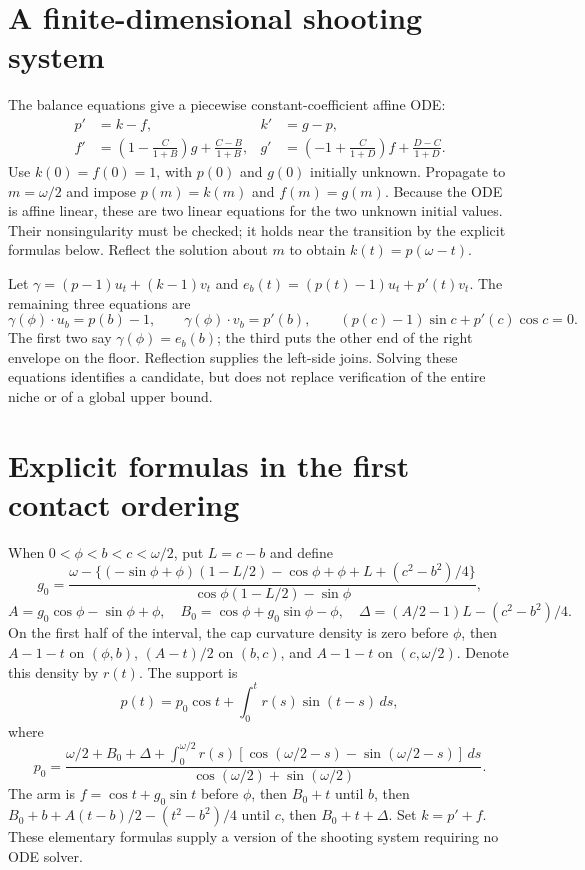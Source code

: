 \documentclass[11pt]{article}
\begin{document}
\section*{A finite-dimensional shooting system}
The balance equations give a piecewise constant-coefficient affine ODE:
\begin{align*}
 p'&=k-f,&k'&=g-p,\\
 f'&=\left(1-\frac{C}{1+B}\right)g+\frac{C-B}{1+B},&
 g'&=\left(-1+\frac{C}{1+D}\right)f+\frac{D-C}{1+D}.
\end{align*}
Use $k(0)=f(0)=1$, with $p(0)$ and $g(0)$ initially unknown. Propagate to $m=\omega/2$ and impose $p(m)=k(m)$ and $f(m)=g(m)$. Because the ODE is affine linear, these are two linear equations for the two unknown initial values. Their nonsingularity must be checked; it holds near the transition by the explicit formulas below. Reflect the solution about $m$ to obtain $k(t)=p(\omega-t)$.

Let $\gamma=(p-1)u_t+(k-1)v_t$ and $e_b(t)=(p(t)-1)u_t+p'(t)v_t$. The remaining three equations are
\[
 \boxed{\gamma(\phi)\cdot u_b=p(b)-1,\qquad
 \gamma(\phi)\cdot v_b=p'(b),\qquad
 (p(c)-1)\sin c+p'(c)\cos c=0.}
\]
The first two say $\gamma(\phi)=e_b(b)$; the third puts the other end of the right envelope on the floor. Reflection supplies the left-side joins. Solving these equations identifies a candidate, but does not replace verification of the entire niche or of a global upper bound.

\section*{Explicit formulas in the first contact ordering}
When $0<\phi<b<c<\omega/2$, put $L=c-b$ and define
\[
 g_0=\frac{\omega-\{(-\sin\phi+\phi)(1-L/2)-\cos\phi+\phi+L+(c^2-b^2)/4\}}
 {\cos\phi(1-L/2)-\sin\phi},
\]
\[
 A=g_0\cos\phi-\sin\phi+\phi,\quad
 B_0=\cos\phi+g_0\sin\phi-\phi,\quad
 \Delta=(A/2-1)L-(c^2-b^2)/4.
\]
On the first half of the interval, the cap curvature density is zero before $\phi$, then $A-1-t$ on $(\phi,b)$, $(A-t)/2$ on $(b,c)$, and $A-1-t$ on $(c,\omega/2)$. Denote this density by $r(t)$. The support is
\[
 p(t)=p_0\cos t+\int_0^t r(s)\sin(t-s)\,ds,
\]
where
\[
 p_0=\frac{\omega/2+B_0+\Delta+
 \int_0^{\omega/2}r(s)[\cos(\omega/2-s)-\sin(\omega/2-s)]\,ds}
 {\cos(\omega/2)+\sin(\omega/2)}.
\]
The arm is $f=\cos t+g_0\sin t$ before $\phi$, then $B_0+t$ until $b$, then
$B_0+b+A(t-b)/2-(t^2-b^2)/4$ until $c$, then $B_0+t+\Delta$. Set $k=p'+f$. These elementary formulas supply a version of the shooting system requiring no ODE solver.
\end{document}
